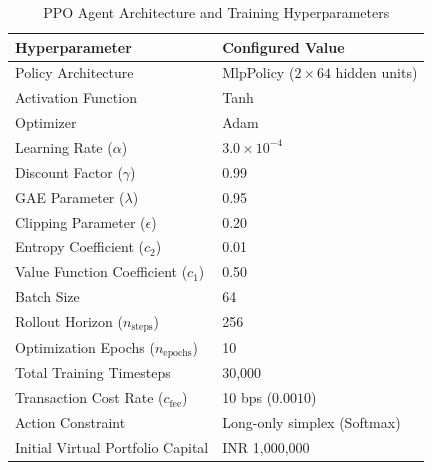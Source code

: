 \documentclass[conference]{IEEEtran}
\begin{document}
\begin{table}[htbp]
\caption{PPO Agent Architecture and Training Hyperparameters}
\label{tab:hyperparams}
\centering
\begin{tabular}{ll}
\toprule
\textbf{Hyperparameter} & \textbf{Configured Value} \\
\midrule
Policy Architecture & MlpPolicy ($2 \times 64$ hidden units) \\
Activation Function & Tanh \\
Optimizer & Adam \\
Learning Rate ($\alpha$) & $3.0 \times 10^{-4}$ \\
Discount Factor ($\gamma$) & 0.99 \\
GAE Parameter ($\lambda$) & 0.95 \\
Clipping Parameter ($\epsilon$) & 0.20 \\
Entropy Coefficient ($c_2$) & 0.01 \\
Value Function Coefficient ($c_1$) & 0.50 \\
Batch Size & 64 \\
Rollout Horizon ($n_{\text{steps}}$) & 256 \\
Optimization Epochs ($n_{\text{epochs}}$) & 10 \\
Total Training Timesteps & 30,000 \\
Transaction Cost Rate ($c_{\text{fee}}$) & 10 bps ($0.0010$) \\
Action Constraint & Long-only simplex (Softmax) \\
Initial Virtual Portfolio Capital & INR 1,000,000 \\
\bottomrule
\end{tabular}
\end{table}
\end{document}
